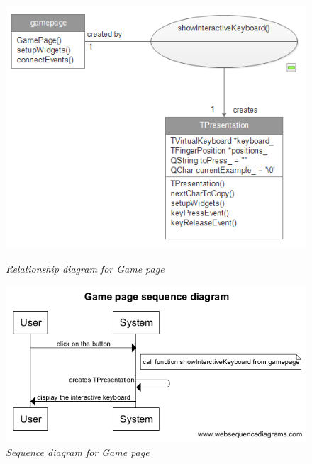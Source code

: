 \begin{figure}[h]
\begin{center}
\begin{minipage}{0.2\linewidth}
      \centering \includegraphics[height=1\textwidth]{images/Rgamepage.png}
      \caption{\it Relationship diagram for Game page}   
\end{minipage}
\begin{minipage}{0.2\linewidth}
      \centering \includegraphics[height=1\textwidth]{images/Sgamepage.png}
      \caption{\it Sequence diagram for Game page}
\end{minipage}
\end{center}
\end{figure}

